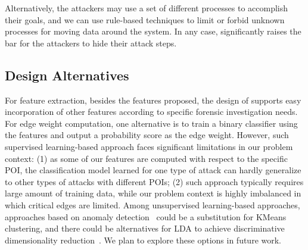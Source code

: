 Alternatively, the attackers may use a set of different processes to accomplish their goals, and we can use rule-based techniques to limit or forbid unknown processes for moving data around the system.  
In any case, \tool significantly raises the bar for the attackers to hide their attack steps. 





%







\subsection{Design Alternatives}
For feature extraction, besides the features proposed, the design of \tool supports easy incorporation of other features according to specific forensic investigation needs.
%
For edge weight computation, one alternative is to train a binary classifier using the features and output a probability score as the edge weight.
However, such supervised learning-based approach faces significant limitations in our problem context:
(1) as some of our features are computed with respect to the specific POI, the classification model learned for one type of attack can hardly generalize to other types of attacks with different POIs;
(2) such approach typically requires large amount of training data, while our problem context is highly imbalanced in which critical edges are limited. 
%
Among unsupervised learning-based approaches, approaches based on anomaly detection~\cite{anomalysurvey} could be a substitution for KMeans clustering, and there could be alternatives for LDA to achieve discriminative dimensionality reduction~\cite{Mika99fisherdiscriminant,sugiyama2006local}.
We plan to explore these options in future work.



